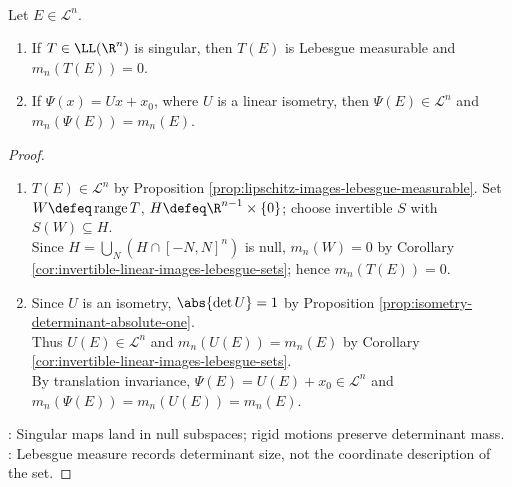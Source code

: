 \begin{corollary} \label{cor:linear-images-rigid-motion-lebesgue-measure} \\
Let $E\in\mathcal{L}^n$.
\begin{enumerate}[label=(\roman*)]
\setlength{\itemsep}{0pt}
\item If $T\in\LL(\R^n)$ is singular, then $T(E)$ is Lebesgue measurable and $m_n(T(E))=0$.
\item If $\Psi(x)=Ux+x_0$, where $U$ is a linear isometry, then $\Psi(E)\in\mathcal{L}^n$ and $m_n(\Psi(E))=m_n(E)$.
\end{enumerate}
\begin{proof}
\begin{enumerate}[label=(\roman*)]
\setlength{\itemsep}{0pt}
\item $T(E)\in\mathcal L^n$ by Proposition \ref{prop:lipschitz-images-lebesgue-measurable}. Set $W\defeq\operatorname{range}T$, $H\defeq\R^{n-1}\times\{0\}$; choose invertible $S$ with $S(W)\subseteq H$.\\
Since $H=\bigcup\limits_N(H\cap[-N,N]^n)$ is null, $m_n(W)=0$ by Corollary \ref{cor:invertible-linear-images-lebesgue-sets}; hence $m_n(T(E))=0$.
\item Since $U$ is an isometry, $\abs{\det U}=1$ by Proposition \ref{prop:isometry-determinant-absolute-one}.\\
Thus $U(E)\in\mathcal L^n$ and $m_n(U(E))=m_n(E)$ by Corollary \ref{cor:invertible-linear-images-lebesgue-sets}.\\
By translation invariance, $\Psi(E)=U(E)+x_0\in\mathcal L^n$ and $m_n(\Psi(E))=m_n(U(E))=m_n(E)$.
\end{enumerate}
: Singular maps land in null subspaces; rigid motions preserve determinant mass.\\
: Lebesgue measure records determinant size, not the coordinate description of the set.
\end{proof}
\end{corollary}
